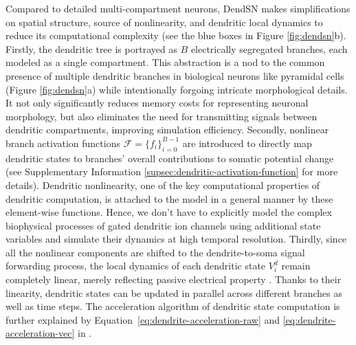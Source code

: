 Compared to detailed multi-compartment neurons, DendSN makes simplifications on spatial structure, source of nonlinearity, and dendritic local dynamics to reduce its computational complexity (see the blue boxes in Figure \ref{fig:dendsn}b). Firstly, the dendritic tree is portrayed as $B$ electrically segregated branches, each modeled as a single compartment. This abstraction is a nod to the common presence of multiple dendritic branches in biological neurons like pyramidal cells \cite{cajal1888estructura,ishizuka1995quantitative} (Figure \ref{fig:dendsn}a) while intentionally forgoing intricate morphological details. It not only significantly reduces memory costs for representing neuronal morphology, but also eliminates the need for transmitting signals between dendritic compartments, improving simulation efficiency. Secondly, nonlinear branch activation functions $\mathcal{F} = \{f_i\}_{i=0}^{B-1}$ are introduced to directly map dendritic states to branches' overall contributions to somatic potential change (see Supplementary Information \ref{supsec:dendritic-activation-function} for more details). Dendritic nonlinearity, one of the key computational properties of dendritic computation, is attached to the model in a general manner by these element-wise functions. Hence, we don't have to explicitly model the complex biophysical processes of gated dendritic ion channels using additional state variables and simulate their dynamics at high temporal resolution. Thirdly, since all the nonlinear components are shifted to the dendrite-to-soma signal forwarding process, the local dynamics of each dendritic state $V^d_i$ remain completely linear, merely reflecting passive electrical property \cite{payeur2019dendriticinfo,mengual2020dendsoma}. Thanks to their linearity, dendritic states can be updated in parallel across different branches as well as time steps. The acceleration algorithm of dendritic state computation is further explained by Equation~\eqref{eq:dendrite-acceleration-raw} and \eqref{eq:dendrite-acceleration-vec} in .

